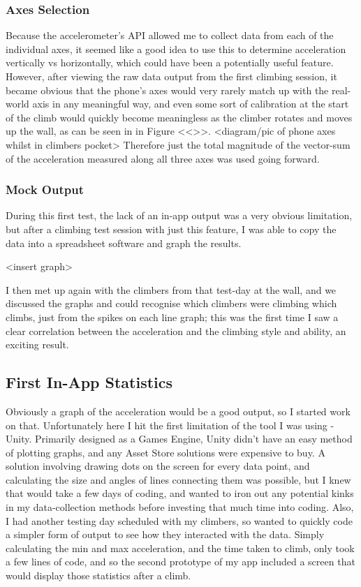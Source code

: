 \subsubsection{Axes Selection}
Because the accelerometer's API allowed me to collect data from each of the individual axes, it seemed like a good idea to use this to determine acceleration vertically vs horizontally, which could have been a potentially useful feature.
However, after viewing the raw data output from the first climbing session, it became obvious that the phone's axes would very rarely match up with the real-world axis in any meaningful way, and even some sort of calibration at the start of the climb would quickly become meaningless as the climber rotates and moves up the wall, as can be seen in in Figure <<>>.
<diagram/pic of phone axes whilst in climbers pocket>
Therefore just the total magnitude of the vector-sum of the acceleration measured along all three axes was used going forward.

\subsubsection{Mock Output}
During this first test, the lack of an in-app output was a very obvious limitation, but after a climbing test session with just this feature, I was able to copy the data into a spreadsheet software and graph the results.

<insert graph>

I then met up again with the climbers from that test-day at the wall, and we discussed the graphs and could recognise which climbers were climbing which climbs, just from the spikes on each line graph; this was the first time I saw a clear correlation between the acceleration and the climbing style and ability, an exciting result.


\subsection{First In-App Statistics}
Obviously a graph of the acceleration would be a good output, so I started work on that.
Unfortunately here I hit the first limitation of the tool I was using - Unity.
Primarily designed as a Games Engine, Unity didn't have an easy method of plotting graphs, and any Asset Store solutions were expensive to buy. 
A solution involving drawing dots on the screen for every data point, and calculating the size and angles of lines connecting them was possible, but I knew that would take a few days of coding, and wanted to iron out any potential kinks in my data-collection methods before investing that much time into coding.
Also, I had another testing day scheduled with my climbers, so wanted to quickly code a simpler form of output to see how they interacted with the data.
Simply calculating the min and max acceleration, and the time taken to climb, only took a few lines of code, and so the second prototype of my app included a screen that would display those statistics after a climb.

